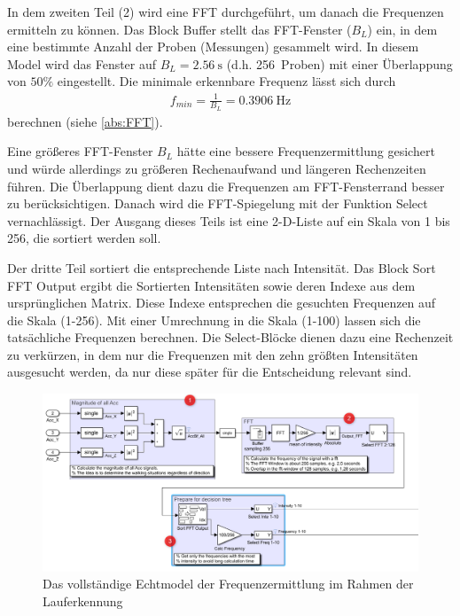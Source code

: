 In dem zweiten Teil (2) wird eine FFT durchgeführt, um danach die Frequenzen ermitteln zu können. Das Block \glqq Buffer\grqq{} stellt das FFT-Fenster ($B_L$) ein, in dem eine bestimmte Anzahl der Proben (Messungen) gesammelt wird. In diesem Model wird das Fenster auf $B_L = \SI{2,56}{\second}$ (d.h. \SI{256}{Proben}) mit einer Überlappung von $50\%$ eingestellt. Die minimale erkennbare Frequenz lässt sich durch
\begin{align*}
	f_{min} = \frac{1}{B_L} = \SI{0,3906}{\hertz}
\end{align*}
berechnen (siehe \autoref{abs:FFT}).

Eine größeres FFT-Fenster $B_L$ hätte eine bessere Frequenzermittlung gesichert und würde allerdings zu größeren Rechenaufwand und längeren Rechenzeiten führen. Die Überlappung dient dazu die Frequenzen am FFT-Fensterrand besser zu berücksichtigen. Danach wird die FFT-Spiegelung mit der Funktion \glqq Select\grqq{} vernachlässigt. Der Ausgang dieses Teils ist eine 2-D-Liste auf ein Skala von 1 bis 256, die sortiert werden soll.

Der dritte Teil sortiert die entsprechende Liste nach Intensität. Das Block \glqq Sort FFT Output\grqq{} ergibt die Sortierten Intensitäten sowie deren Indexe aus dem ursprünglichen Matrix. Diese Indexe entsprechen die gesuchten Frequenzen auf die Skala (1-256). Mit einer Umrechnung in die Skala (1-100) lassen sich die tatsächliche Frequenzen berechnen. Die \glqq Select\grqq{}-Blöcke dienen dazu eine Rechenzeit zu verkürzen, in dem nur die Frequenzen mit den zehn größten Intensitäten ausgesucht werden, da nur diese später für die Entscheidung relevant sind.

\begin{figure}
	\centering
	\includegraphics[width=\linewidth]{Bilder/Lauferkennung_Modell_1_1.png}
	\caption{Das vollständige Echtmodel der Frequenzermittlung im Rahmen der Lauferkennung}
	\label{fig:Lauferkennung_Freqbasiert_FFT_Echtmodell}
\end{figure}

